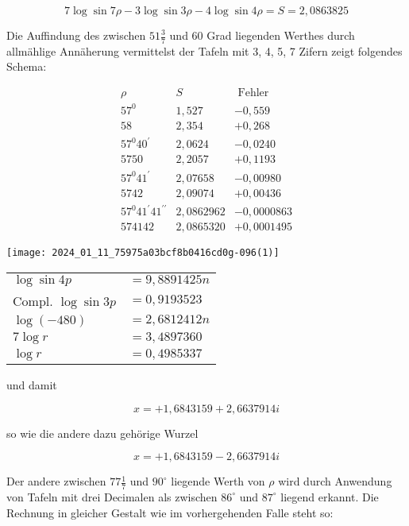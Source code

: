 \documentclass[10pt]{article}
\begin{document}
\[
7 \log \sin 7 \rho-3 \log \sin 3 \rho-4 \log \sin 4 \rho=S=2,0863825
\]

Die Auffindung des zwischen \(51 \frac{3}{7}\) und 60 Grad liegenden Werthes durch allmählige Annäherung vermittelst der Tafeln mit 3, 4, 5, 7 Zifern zeigt folgendes Schema:

\[
\begin{array}{l|l|l}
\rho & S & \text { Fehler } \\
57^{0} & 1,527 & -0,559 \\
58 & 2,354 & +0,268 \\
57^{0} 40^{\prime} & 2,0624 & -0,0240 \\
5750 & 2,2057 & +0,1193 \\
57^{0} 41^{\prime} & 2,07658 & -0,00980 \\
5742 & 2,09074 & +0,00436 \\
57^{0} 41^{\prime} 41^{\prime \prime} & 2,0862962 & -0,0000863 \\
574142 & 2,0865320 & +0,0001495
\end{array}
\]

\begin{center}
\texttt{[image: 2024\_01\_11\_75975a03bcf8b0416cd0g-096(1)]}
\end{center}

\begin{center}
\begin{tabular}{ll}
\(\log \sin 4 p\) & \(=9,8891425 n\) \\
Compl. \(\log \sin 3 p\) & \(=0,9193523\) \\
\(\log (-480)\) & \(=2,6812412 n\) \\
\hline
\(7 \log r\) & \(=3,4897360\) \\
\(\log r\) & \(=0,4985337\) \\
\end{tabular}
\end{center}

und damit

\[
x=+1,6843159+2,6637914 i
\]

so wie die andere dazu gehörige Wurzel

\[
x=+1,6843159-2,6637914 i
\]

Der andere zwischen \(77 \frac{1}{7}\) und \(90^{\circ}\) liegende Werth von \(\rho\) wird durch Anwendung von Tafeln mit drei Decimalen als zwischen \(86^{\circ}\) und \(87^{\circ}\) liegend erkannt. Die Rechnung in gleicher Gestalt wie im vorhergehenden Falle steht so:
\end{document}
